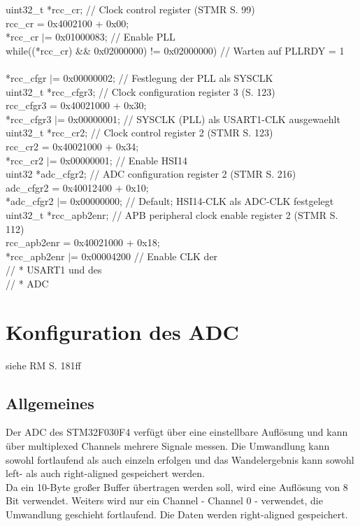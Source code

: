 \documentclass[11pt]{report}
\begin{document}
	uint32\_t *rcc\_cr; // Clock control register (STMR S. 99)\\
	rcc\_cr = 0x4002100 + 0x00;\\
	*rcc\_cr $|$= 0x01000083; // Enable PLL\\
	while((*rcc\_cr) \&\& 0x02000000) != 0x02000000){ // Warten auf PLLRDY = 1\\
	}\\

	*rcc\_cfgr $|$= 0x00000002; // Festlegung der PLL als SYSCLK\\

	uint32\_t *rcc\_cfgr3; // Clock configuration register 3 (S. 123)\\
	rcc\_cfgr3 = 0x40021000 + 0x30;\\
	*rcc\_cfgr3 $|$= 0x00000001; // SYSCLK (PLL) als USART1-CLK ausgewaehlt\\

	uint32\_t *rcc\_cr2; // Clock control register 2 (STMR S. 123)\\
	rcc\_cr2 = 0x40021000 + 0x34;\\
	*rcc\_cr2 $|$= 0x00000001; // Enable HSI14\\
	
	uint32 *adc\_cfgr2; // ADC configuration register 2 (STMR S. 216)\\
	adc\_cfgr2 = 0x40012400 + 0x10;\\
	*adc\_cfgr2 $|$= 0x00000000; // Default; HSI14-CLK als ADC-CLK festgelegt\\
	
	uint32\_t *rcc\_apb2enr; // APB peripheral clock enable register 2 (STMR S. 112)\\
	rcc\_apb2enr = 0x40021000 + 0x18;\\
	*rcc\_apb2enr $|$= 0x00004200 // Enable CLK der\\
	// * USART1 und des\\
	// * ADC
	\section{Konfiguration des ADC}
		siehe RM S. 181ff
		\subsection{Allgemeines}
			Der ADC des STM32F030F4 verfügt über eine einstellbare Auflösung und kann über multiplexed Channels mehrere Signale messen. Die Umwandlung kann sowohl fortlaufend als auch einzeln erfolgen und das Wandelergebnis kann sowohl left- als auch right-aligned gespeichert werden.\\
			Da ein 10-Byte großer Buffer übertragen werden soll, wird eine Auflösung von 8 Bit verwendet. Weiters wird nur ein Channel - Channel 0 - verwendet, die Umwandlung geschieht fortlaufend. Die Daten werden right-aligned gespeichert.
\end{document}
